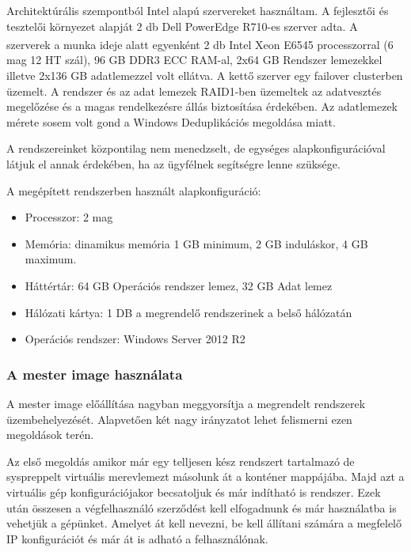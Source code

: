 \documentclass[12pt,oneside,justify]{book}
\begin{document}
\noindent Architektúrális szempontból Intel alapú szervereket használtam. A fejlesztői és tesztelői környezet alapját 2 db Dell PowerEdge R710-es szerver adta. A szerverek a munka ideje alatt egyenként 2 db Intel{\textsuperscript{\textregistered}} Xeon{\textsuperscript{\textregistered}} E6545 processzorral (6 mag 12 HT szál), 96 GB DDR3 ECC RAM-al, 2x64 GB Rendszer lemezekkel illetve 2x136 GB adatlemezzel volt ellátva. A kettő szerver egy failover clusterben üzemelt. A rendszer és az adat lemezek RAID1-ben üzemeltek az adatvesztés megelőzése és a magas rendelkezésre állás biztosítása érdekében. Az adatlemezek mérete sosem volt gond a Windows Deduplikációs megoldása miatt.

\noindent
A rendszereinket központilag nem menedzselt, de egységes alapkonfigurációval látjuk el annak érdekében, ha az ügyfélnek segítségre lenne szüksége. 

\noindent
A megépített rendszerben használt alapkonfiguráció:
\begin{itemize}
	\item Processzor: 2 mag
	\item Memória: dinamikus memória 1 GB minimum, 2 GB induláskor, 4 GB maximum.
	\item Háttértár: 64 GB Operációs rendszer lemez, 32 GB Adat lemez
	\item Hálózati kártya: 1 DB a megrendelő rendszerinek a belső hálózatán
	\item Operációs rendszer: Windows Server 2012 R2
\end{itemize}

\subsubsection{A mester image használata}

\noindent A mester image előállítása nagyban meggyorsítja a megrendelt rendszerek üzembehelyezését. Alapvetően két nagy irányzatot lehet felismerni ezen megoldások terén. 

\noindent
Az első megoldás amikor már egy telljesen kész rendszert tartalmazó de syspreppelt virtuális merevlemezt másolunk át a konténer mappájába. Majd azt a virtuális gép konfigurációjakor becsatoljuk és már indítható is rendszer. Ezek után összesen a végfelhasználó szerződést kell elfogadnunk és már használatba is vehetjük a gépünket. Amelyet át kell nevezni, be kell állítani számára a megfelelő IP konfigurációt és már át is adható a felhasználónak. 
\end{document}
